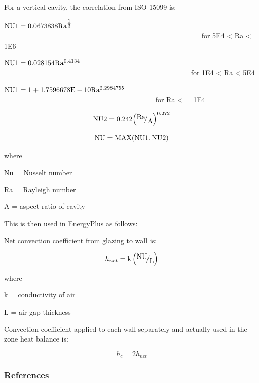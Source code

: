 For a vertical cavity, the correlation from ISO 15099 is:

\({\rm{NU1 = 0}}{\rm{.0673838 R}}{{\rm{a}}^{{\textstyle{{\rm{1}} \over {\rm{3}}}}}}\) ~~~~~~~~~~~~~~~~~~~~~~~~~~~~~~~~~~~~~~~~~~~~~~~~~~~~~~~ for 5E4 \textless{} Ra \textless{} 1E6

\({\rm{NU1 = 0}}{\rm{.028154 R}}{{\rm{a}}^{{\rm{0}}{\rm{.4134}}}}\) ~~~~~~~~~~~~~~~~~~~~~~~~~~~~~~~~~~~~~~~~~~~~~~~~~~~~ for 1E4 \textless{} Ra \textless{} 5E4

\({\rm{NU1 = 1 + 1}}{\rm{.7596678E - 10 R}}{{\rm{a}}^{{\rm{2}}{\rm{.2984755}}}}\) ~~~~~~~~~~~~~~~~~~~~~~~~~~~~~~~~~~~~~~~~~~ for Ra \textless{} = 1E4

\begin{equation}
{\rm{NU2}} = 0.242{\left( {{\raise0.7ex\hbox{{{\rm{Ra}}}} \!\mathord{\left/ {\vphantom {{{\rm{Ra}}} {\rm{A}}}}\right.}\!\lower0.7ex\hbox{{\rm{A}}}}} \right)^{0.272}}
\end{equation}

\begin{equation}
{\rm{NU = MAX(NU1,NU2)}}
\end{equation}

where

Nu = Nusselt number

Ra = Rayleigh number

A = aspect ratio of cavity

This is then used in EnergyPlus as follows:

Net convection coefficient from glazing to wall is:

\begin{equation}
{h_{net}} = {\rm{k}}\left( {{\raise0.7ex\hbox{{{\rm{NU}}}} \!\mathord{\left/ {\vphantom {{{\rm{NU}}} {\rm{L}}}}\right.}\!\lower0.7ex\hbox{{\rm{L}}}}} \right)
\end{equation}

where

k = conductivity of air

L = air gap thickness

Convection coefficient applied to each wall separately and actually used in the zone heat balance is:

\begin{equation}
{h_c} = 2{h_{net}}
\end{equation}

\subsubsection{References}\label{references-032}

